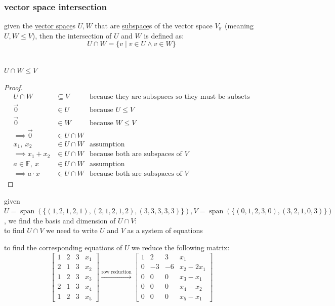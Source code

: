\documentclass[a4paper,12pt]{article}
\DeclareMathOperator{\spn}{span}
\begin{document}
\subsubsection{vector space intersection}
\label{sec:org0ca5ccf}
\begin{definition}
given the \hyperref[sec:orgea93933]{vector space}s \(U,W\) that are \hyperref[sec:org3f77751]{subspace}s of the vector space \(V_\mathbb{F}\) (meaning \(U,W \leq V\)), then the intersection of \(U\) and \(W\) is defined as:\\
\[
  U \cap W = \{v \mid v \in U \land v \in W\}
\]\\

\begin{lemma}
\(U \cap W \leq V\)\\
\begin{proof}
\begin{align*}
  U \cap W &\subseteq V &\text{because they are subspaces so they must be subsets}\\
  \vec0 &\in U &\text{because } U \leq V\\
  \vec0 &\in W &\text{because } W \leq V\\
  \implies \vec0 &\in U \cap W\\
  x_1,\ x_2 &\in U \cap W & \text{assumption}\\
  \implies x_1 + x_2 &\in U \cap W &\text{because both are subspaces of } V\\
  a \in \mathbb{F},\ x &\in U \cap W &\text{assumption}\\
  \implies a \cdot x &\in U \cap W &\text{because both are subspaces of } V
\end{align*}
\end{proof}
\end{lemma}
\begin{my_example}
given \(U=\spn(\{(1,2,1,2,1),(2,1,2,1,2),(3,3,3,3,3)\}),V=\spn(\{(0,1,2,3,0),(3,2,1,0,3)\})\), we find the basis and dimension of \(U\cap V\):\\
to find \(U\cap V\) we need to write \(U\) and \(V\) as a system of equations\\
\begin{step}
to find the corresponding equations of \(U\) we reduce the following matrix:\\
\[
\left[\begin{array}{ccc|c} 1 & 2 & 3 & x_1\\ 2 & 1 & 3 & x_2\\ 1 & 2 & 3 & x_3\\ 2 & 1 & 3 & x_4\\ 1 & 2 & 3 & x_5 \end{array}\right] \xrightarrow{\text{row reduction}} \left[\begin{array}{ccc|c} 1 & 2 & 3 & x_1\\ 0 & -3 & -6 & x_2-2x_1\\ 0 & 0 & 0 & x_3-x_1\\ 0 & 0 & 0 & x_4-x_2\\ 0 & 0 & 0 & x_5-x_1 \end{array}\right]
\]
\end{step}
\end{my_example}
\end{definition}
\end{document}
